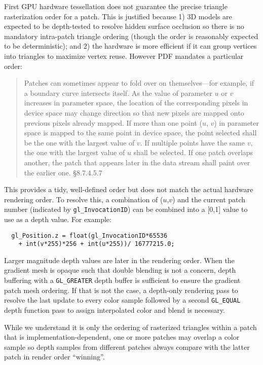 First GPU hardware tessellation does not guarantee the precise triangle
rasterization order for a patch.  This is justified because 1) 3D models are expected to be depth-tested to resolve hidden surface occlusion so there is no mandatory intra-patch triangle ordering (though the order is reasonably expected to
be deterministic); and 2) the hardware is more efficient if it can group vertices into triangles to maximize
vertex reuse.  However PDF mandates a particular order:
\begin{quote}
\small
Patches can sometimes appear to fold over on themselves---for example, if a boundary curve intersects itself. 
As the value of parameter $u$ or $v$ increases in parameter space, the location of the corresponding pixels in 
device space may change direction so that new pixels are mapped onto previous pixels already mapped. If 
more than one point ($u$, $v$) in parameter space is mapped to the same point in device space, the point selected 
shall be the one with the largest value of $v$. If multiple points have the same $v$, the one with the largest value of 
$u$ shall be selected. If one patch overlaps another, the patch that appears later in the data stream shall paint 
over the earlier one. 
\cite{PDF-Spec} \S 8.7.4.5.7
\end{quote}
This provides a tidy, well-defined order but does not match the actual hardware rendering order.
To resolve this, a combination of ($u$,$v$) and the current patch number
(indicated by {\tt gl\_InvocationID}) can be combined into a [0,1] value to use as a depth value.  For example:
\begin{verbatim}
  gl_Position.z = float(gl_InvocationID*65536
    + int(v*255)*256 + int(u*255))/ 16777215.0;
\end{verbatim}
Larger magnitude depth values are later in the rendering order.  When the gradient mesh is opaque such that
double blending is not a concern, depth buffering with a {\tt GL\_GREATER} depth buffer is sufficient to ensure
the gradient patch mesh ordering.  If that is not the case, a depth-only rendering pass to resolve the last
update to every color sample followed by a second {\tt GL\_EQUAL} depth function pass to assign interpolated color
and blend is necessary.

While we understand it is only the ordering of rasterized triangles within a patch that is implementation-dependent,
one or more patches may overlap a color sample so depth samples from different patches always compare with the latter patch in render order ``winning''.

